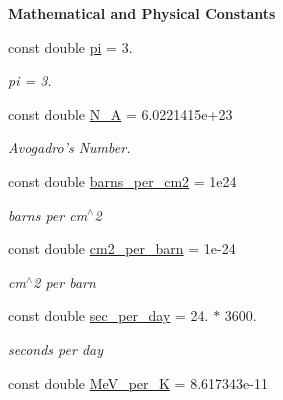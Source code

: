 \begin{Indent}{\bf Mathematical and Physical Constants}\par
\begin{DoxyCompactItemize}
\item 
\hypertarget{namespacepyne_a3b91aba14e56f740dc75b78b9eba037a}{const double \hyperlink{namespacepyne_a3b91aba14e56f740dc75b78b9eba037a}{pi} = 3.}\label{namespacepyne_a3b91aba14e56f740dc75b78b9eba037a}

\begin{DoxyCompactList}\small\item\em pi = 3. \end{DoxyCompactList}\item 
\hypertarget{namespacepyne_a44461c2367af5fc9b6bb0988aac2429b}{const double \hyperlink{namespacepyne_a44461c2367af5fc9b6bb0988aac2429b}{N\-\_\-\-A} = 6.\-0221415e+23}\label{namespacepyne_a44461c2367af5fc9b6bb0988aac2429b}

\begin{DoxyCompactList}\small\item\em Avogadro's Number. \end{DoxyCompactList}\item 
\hypertarget{namespacepyne_ad475cf6f124859f735f6d93ec206ec0d}{const double \hyperlink{namespacepyne_ad475cf6f124859f735f6d93ec206ec0d}{barns\-\_\-per\-\_\-cm2} = 1e24}\label{namespacepyne_ad475cf6f124859f735f6d93ec206ec0d}

\begin{DoxyCompactList}\small\item\em barns per cm$^\wedge$2 \end{DoxyCompactList}\item 
\hypertarget{namespacepyne_a0706fc6ba35f0c6f85cea550344c1815}{const double \hyperlink{namespacepyne_a0706fc6ba35f0c6f85cea550344c1815}{cm2\-\_\-per\-\_\-barn} = 1e-\/24}\label{namespacepyne_a0706fc6ba35f0c6f85cea550344c1815}

\begin{DoxyCompactList}\small\item\em cm$^\wedge$2 per barn \end{DoxyCompactList}\item 
\hypertarget{namespacepyne_a3a54f183e7323b4d62c12f309c3af081}{const double \hyperlink{namespacepyne_a3a54f183e7323b4d62c12f309c3af081}{sec\-\_\-per\-\_\-day} = 24. $\ast$ 3600.}\label{namespacepyne_a3a54f183e7323b4d62c12f309c3af081}

\begin{DoxyCompactList}\small\item\em seconds per day \end{DoxyCompactList}\item 
const double \hyperlink{namespacepyne_af4fb3aac22e7bda0ece3bcf515151611}{Me\-V\-\_\-per\-\_\-\-K} = 8.\-617343e-\/11
\end{DoxyCompactItemize}
\end{Indent}
